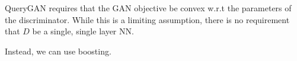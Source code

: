 QueryGAN requires that the GAN objective be convex w.r.t the parameters of the discriminator. While this is a limiting assumption, there is no requirement that $D$ be a single, single layer NN.

Instead, we can use boosting. 

\eq


